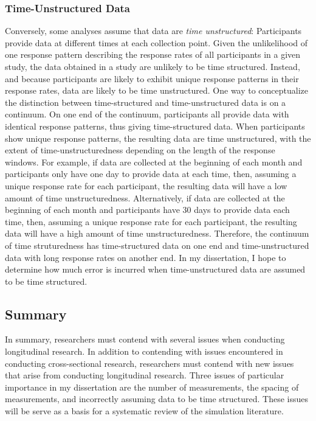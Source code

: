 \documentclass[
12pt, %
twoside,
english]{guelphthesis}
\theoremstyle{definition}
\theoremstyle{definition}
\theoremstyle{definition}
\theoremstyle{definition}
\theoremstyle{remark}
\begin{document}
\hypertarget{time-unstructured-data}{%
\subsubsection{Time-Unstructured Data}\label{time-unstructured-data}}

Conversely, some analyses assume that data are \emph{time unstructured}: Participants provide data at different times at each collection point. Given the unlikelihood of one response pattern describing the response rates of all participants in a given study, the data
obtained in a study are unlikely to be time structured. Instead, and because participants are likely to exhibit unique response
patterns in their response rates, data are likely to be time unstructured. One way to conceptualize the distinction between time-structured and time-unstructured data is on a continuum. On one end of the continuum, participants all provide data with identical response patterns, thus giving time-structured data. When participants show unique response patterns, the resulting data are time unstructured, with the extent of time-unstructuredness depending on the length of the response windows. For example, if data are collected at the beginning of each month and participants only have one day to provide data at each time, then, assuming a unique response rate for each participant, the resulting data will have a low amount of time unstructuredness. Alternatively, if data are collected at the beginning of each month and participants have 30 days to provide data each time, then, assuming a unique response rate for each participant, the resulting data will have a high amount of time unstructuredness. Therefore, the continuum of time struturedness has time-structured data on one end and time-unstructured data with long response rates on another end. In my dissertation, I hope to determine how much error is incurred when time-unstructured data are assumed to be time structured.

\hypertarget{summary}{%
\subsection{Summary}\label{summary}}

In summary, researchers must contend with several issues when conducting longitudinal research. In addition to contending with issues encountered in conducting cross-sectional research, researchers must contend with new issues that arise from conducting longitudinal research. Three issues of particular importance in my dissertation are the number of measurements, the spacing of measurements, and incorrectly assuming data to be time structured. These issues will be serve as a basis for a systematic review of the simulation literature.
\end{document}
